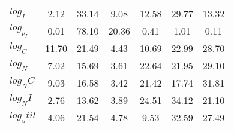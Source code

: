 \begin{center}
\begin{longtable}{lcccccc}
$log_I     $	 & 	        2.12	 & 	       33.14	 & 	        9.08	 & 	       12.58	 & 	       29.77	 & 	       13.32 \\ 
$log_p_I   $	 & 	        0.01	 & 	       78.10	 & 	       20.36	 & 	        0.41	 & 	        1.01	 & 	        0.11 \\ 
$log_C     $	 & 	       11.70	 & 	       21.49	 & 	        4.43	 & 	       10.69	 & 	       22.99	 & 	       28.70 \\ 
$log_N     $	 & 	        7.02	 & 	       15.69	 & 	        3.61	 & 	       22.64	 & 	       21.95	 & 	       29.10 \\ 
$log_NC    $	 & 	        9.03	 & 	       16.58	 & 	        3.42	 & 	       21.42	 & 	       17.74	 & 	       31.81 \\ 
$log_NI    $	 & 	        2.76	 & 	       13.62	 & 	        3.89	 & 	       24.51	 & 	       34.12	 & 	       21.10 \\ 
$log_util  $	 & 	        4.06	 & 	       21.54	 & 	        4.78	 & 	        9.53	 & 	       32.59	 & 	       27.49 \\ 
\end{longtable}
 \end{center}
